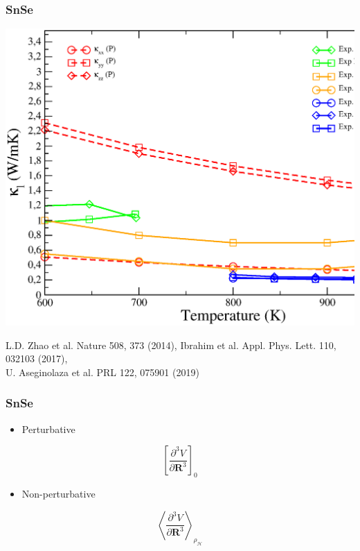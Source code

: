 \documentclass{beamer}
\begin{document}
\begin{frame}

\frametitle{SnSe}
\vspace{-0.5cm}
\begin{center}
 \includegraphics[width=0.75\linewidth]{Pictures/SnSe/tk-SnSe1.eps}
\end{center}
\begin{tiny}
 L.D. Zhao et al. Nature 508, 373 (2014),
 Ibrahim et al. Appl. Phys. Lett. 110, 032103 (2017), \\
 U. Aseginolaza et al. PRL 122, 075901 (2019)
\end{tiny}

\end{frame}


\begin{frame}

\frametitle{SnSe}
\begin{itemize}
 \item Perturbative
\end{itemize}
\begin{huge}
\begin{equation}
 \nonumber
 \left[\frac{\partial^{3}V}{\partial\boldsymbol{R}^{3}}\right]_{0}
\end{equation}
\end{huge}
\begin{itemize}
 \item Non-perturbative
\end{itemize}
\begin{huge}
\begin{equation}
 \nonumber
 \left\langle\frac{\partial^{3}V}{\partial\boldsymbol{R}^{3}}\right\rangle_{\rho_{\mathcal{H}}}
\end{equation}
\end{huge}

\end{frame}
\end{document}
